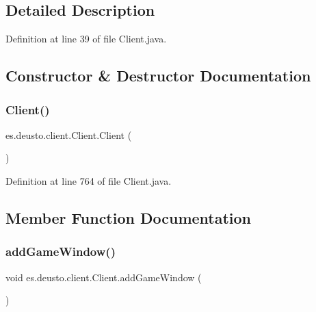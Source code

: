 \subsection{Detailed Description}


Definition at line 39 of file Client.\+java.



\subsection{Constructor \& Destructor Documentation}
\mbox{\label{classes_1_1deusto_1_1client_1_1_client_a71c03e318a72447da873297f3364f67f}} 
\subsubsection{\texorpdfstring{Client()}{Client()}}
{\footnotesize\ttfamily es.\+deusto.\+client.\+Client.\+Client (\begin{DoxyParamCaption}{ }\end{DoxyParamCaption})}



Definition at line 764 of file Client.\+java.



\subsection{Member Function Documentation}
\mbox{\label{classes_1_1deusto_1_1client_1_1_client_ac331cfb4a526be39d17a9d43136dc153}} 
\subsubsection{\texorpdfstring{add\+Game\+Window()}{addGameWindow()}}
{\footnotesize\ttfamily void es.\+deusto.\+client.\+Client.\+add\+Game\+Window (\begin{DoxyParamCaption}{ }\end{DoxyParamCaption})}



